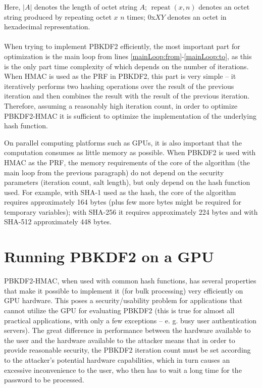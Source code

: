 \documentclass[12pt,oneside]{fithesis2}
\begin{document}
      Here, $|A|$ denotes the length of octet string $A$; $\operatorname{repeat}(x, n)$ denotes an octet string produced by repeating octet $x$ $n$ times; 0x$XY$ denotes an octet in hexadecimal representation.
      
      \paragraph*{}
      When trying to implement PBKDF2 efficiently, the most important part for optimization is the main loop from lines \ref{mainLoop:from}-\ref{mainLoop:to}, as this is the only part time complexity of which depends on the number of iterations. When HMAC is used as the PRF in PBKDF2, this part is very simple -- it iteratively performs two hashing operations over the result of the previous iteration and then combines the result with the result of the previous iteration. Therefore, assuming a reasonably high iteration count, in order to optimize PBKDF2-HMAC it is sufficient to optimize the implementation of the underlying hash function.
      
      On parallel computing platforms such as GPUs, it is also important that the computation consumes as little memory as possible. When PBKDF2 is used with HMAC as the PRF, the memory requirements of the core of the algorithm (the main loop from the previous paragraph) do not depend on the security parameters (iteration count, salt length), but only depend on the hash function used. For example, with SHA-1 used as the hash, the core of the algorithm requires approximately 164 bytes (plus few more bytes might be required for temporary variables); with SHA-256 it requires approximately 224 bytes and with SHA-512 approximately 448 bytes.
      
      \section{Running PBKDF2 on a GPU} \label{s:PBKDF2onGPU}
      PBKDF2-HMAC, when used with common hash functions, has several properties that make it possible to implement it (for bulk processing) very efficiently on GPU hardware. This poses a security/usability problem for applications that cannot utilize the GPU for evaluating PBKDF2 (this is true for almost all practical applications, with only a few exceptions -- e. g. busy user authentication servers). The great difference in performance between the hardware available to the user and the hardware available to the attacker means that in order to provide reasonable security, the PBKDF2 iteration count must be set according to the attacker's potential hardware capabilities, which in turn causes an excessive inconvenience to the user, who then has to wait a long time for the password to be processed.
      
\end{document}
